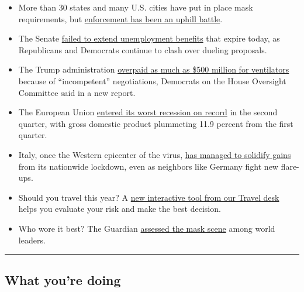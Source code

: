 \begin{itemize}
\item
  More than 30 states and many U.S. cities have put in place mask
  requirements, but
  \href{https://www.nytimes3xbfgragh.onion/2020/07/31/us/coronavirus-masks-enforcement-key-west.html}{enforcement
  has been an uphill battle}.
\item
  The Senate
  \href{https://www.nytimes3xbfgragh.onion/2020/07/30/us/politics/senate-virus-aid.html}{failed
  to extend unemployment benefits} that expire today, as Republicans and
  Democrats continue to clash over dueling proposals.
\item
  The Trump administration
  \href{https://www.nytimes3xbfgragh.onion/2020/07/31/world/coronavirus-covid-19.html\#link-3a85f957}{overpaid
  as much as \$500 million for ventilators} because of ``incompetent''
  negotiations, Democrats on the House Oversight Committee said in a new
  report.
\item
  The European Union
  \href{https://www.nytimes3xbfgragh.onion/live/2020/07/31/business/stock-market-today-coronavirus\#europes-contraction-is-its-worst-on-record}{entered
  its worst recession on record} in the second quarter, with gross
  domestic product plummeting 11.9 percent from the first quarter.
\item
  Italy, once the Western epicenter of the virus,
  \href{https://www.nytimes3xbfgragh.onion/2020/07/31/world/europe/italy-coronavirus-reopening.html}{has
  managed to solidify gains} from its nationwide lockdown, even as
  neighbors like Germany fight new flare-ups.
\item
  Should you travel this year? A
  \href{https://www.nytimes3xbfgragh.onion/interactive/2020/07/31/travel/coronavirus-travel-risk.html}{new
  interactive tool from our Travel desk} helps you evaluate your risk
  and make the best decision.
\item
  Who wore it best? The Guardian
  \href{https://www.theguardian.com/world/2020/jul/31/politicians-face-masks-winners-and-losers-in-pictures-coronavirus}{assessed
  the mask scene} among world leaders.
\end{itemize}

\begin{center}\rule{0.5\linewidth}{\linethickness}\end{center}

\hypertarget{what-youre-doing}{%
\subsection{What you're doing}\label{what-youre-doing}}

